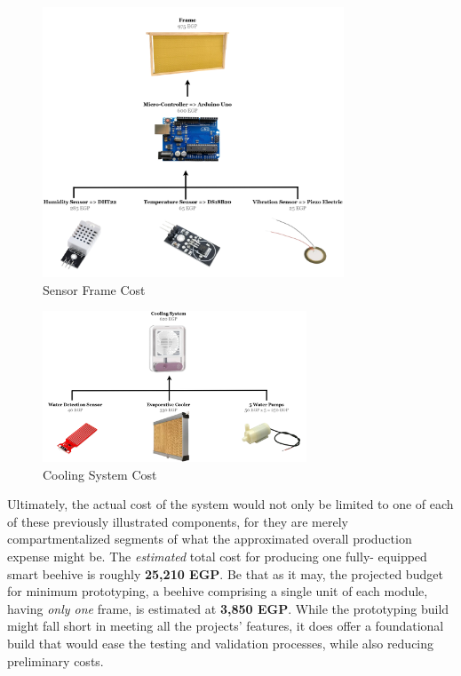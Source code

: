 \documentclass[12pt]{article}
\begin{document}
	\begin{figure}[H]
		\centering
		\includegraphics[width=0.8\textwidth]{Images/Components/Frame Cost.png}
		\caption{Sensor Frame Cost }
		\label{fig:FRAME_COST}
	\end{figure}
	\vspace{0.3 cm}
	\begin{figure}[H]
		\centering
		\includegraphics[width=0.7\textwidth]{Images/Components/Cooling System Cost.png}
		\caption{Cooling System Cost }
		\label{fig:COOLING_COST}
	\end{figure}
	\newpage
	\vspace{1 cm}
	\hspace{-0.65 cm}Ultimately, the actual cost of the system would not only be limited to one of each of these previously illustrated components, for they are merely compartmentalized segments of what the approximated overall production expense might be. The \textit{estimated} total cost for producing one fully- equipped smart beehive is roughly \textbf{25,210 EGP}. Be that as it may, the projected budget for minimum prototyping, a beehive comprising a single unit of each module, having  \textit{only one} frame, is estimated at \textbf{3,850 EGP}. While the prototyping build might fall short in meeting all the projects' features, it does offer a foundational build that would ease the testing and validation processes, while also reducing preliminary costs.
\end{document}
